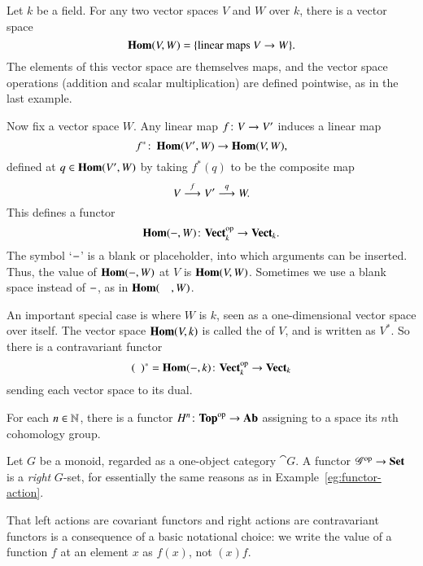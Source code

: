 \begin{example}
\label{eg:fns-on-vs}
Let $k$ be a field.  For any two vector spaces $V$ and $W$ over $k$, there
is a vector space
\[
\HOM(V, W) 
=
\{ \text{linear maps } V \to W \}.%
%
\index{vector space!linear maps@of linear maps}
%
\ntn{HOM}
%
\]
The elements of this vector space are themselves maps, and the vector space
operations (addition and scalar multiplication) are defined pointwise, as
in the last example.

Now fix a vector space $W$.  Any linear map $f\from V \to V'$ induces a linear
map 
\[
f^*\from \HOM(V', W) \to \HOM(V, W),%
%
\ntn{dual-map}
%
\]
defined at $q\in \operatorname{\mathbf{Hom}}(V', W)$ by taking $f^*(q)$ to be the composite map
\[
V \stackrel{f}{\longrightarrow} V' \stackrel{q}{\longrightarrow} W.
\]
This defines a functor
\[
\HOM(\dashbk, W)\from \Vect_k^\op \to \Vect_k.
\]
The symbol `$-$'%
%
%
is a blank or placeholder, into which arguments can be inserted.  Thus, the
value of $\operatorname{\mathbf{Hom}}(-, W)$ at $V$ is $\operatorname{\mathbf{Hom}}(V, W)$.  Sometimes we use a
blank space%
%
%
instead of $-$, as in $\operatorname{\mathbf{Hom}}(\hspace*{1em}, W)$.

An important special case is where $W$ is $k$, seen as a one-dimensional
vector space over itself.  The vector space $\operatorname{\mathbf{Hom}}(V, k)$ is called the
%
%
%
%
%
of $V$, and is written as $V^*$.%
%
%
So there is a contravariant functor
\[
\blank^* = \HOM(\dashbk, k)\from \Vect_k^\op \to \Vect_k
\]
sending each vector space to its dual.
\end{example}

\begin{example}
For each $n\in\mathbb{N}$, there is a functor $H^n\from  \Tp^\op
\to \Ab$%
%
%
assigning to a space its $n$th cohomology%
%
%
group.
\end{example}

\begin{example}
\label{eg:contra-functors:actions}
Let $G$ be a monoid, regarded as a one-object category $\cat{G}$.  A
functor $\mathscr{G}^{\mathrm{op}} \to \mathbf{Set}$ is a \emph{right} $G$-set,%
%
%
for essentially the same reasons as in Example~\ref{eg:functor-action}.

That left actions are covariant functors and right actions are
contravariant functors is a consequence of a basic notational choice: we
write the value of a function $f$ at an element $x$ as $f(x)$, not $(x)f$.
\end{example}

